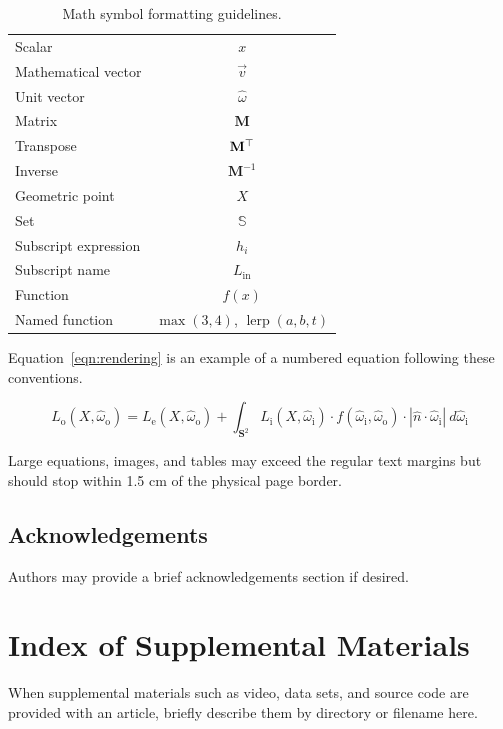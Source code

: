 \documentclass{jcgt}
\begin{document}
\begin{table}[htdp]
\small
\begin{center}
\begin{tabular}{l|c}
Scalar & $x$\\
Mathematical vector & $\vec{v}$ \\
Unit vector & $\hat{\omega}$ \\
Matrix & $\mathbf{M}$ \\
Transpose & $\mathbf{M}^\top$\\
Inverse & $\mathbf{M}^{-1}$\\
Geometric point & $X$ \\
Set & $\mathbb{S}$ \\
Subscript expression & $h_i$ \\
Subscript name & $L_\mathrm{in}$ \\
Function & $f(x)$ \\
Named function & $\max(3, 4)$, $\operatorname{lerp}(a, b, t)$
\end{tabular}
\end{center}
\caption{Math symbol formatting guidelines.}
\label{tbl:math}
\end{table}

\noindent Equation~\ref{eqn:rendering} is an example of a numbered equation following these conventions.

\begin{equation}
L_\mathrm{o}(X, \hat{\omega}_\mathrm{o}) = L_\mathrm{e}(X, \hat{\omega}_\mathrm{o}) + \int_{\mathbf{S}^2} L_\mathrm{i}(X, \hat{\omega}_\mathrm{i}) \cdot f(\hat{\omega}_\mathrm{i}, \hat{\omega}_\mathrm{o}) \cdot |\hat{n} \cdot \hat{\omega}_\mathrm{i} |~ d\hat{\omega}_\mathrm{i}
\label{eqn:rendering}
\end{equation}

Large equations, images, and tables may exceed the regular text margins but should stop within 1.5 cm of the physical page border.

\subsection*{Acknowledgements}
Authors may provide a brief acknowledgements section if desired.

\small



\section*{Index of Supplemental Materials}
When supplemental materials such as video, data sets, and source code are provided with an article, briefly describe them by directory or filename here.
\end{document}
